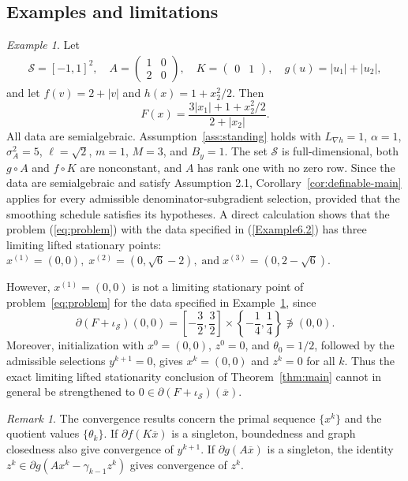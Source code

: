 \documentclass[9pt]{article}
\numberwithin{equation}{section}
\theoremstyle{definition}
\theoremstyle{remark}
\newtheorem{remark}[theorem]{Remark}
\newtheorem{example}[theorem]{Example}
\newcommand{\Sset}{\mathcal S}
\newcommand{\abs}[1]{\left\lvert #1\right\rvert}
\begin{document}
\subsection{Examples and limitations}
\label{subsec:examples-limitations}
\begin{example}
\label{ex:active}
Let
\begin{eqnarray}\label{Example6.2}
 \Sset=[-1,1]^2,\quad
 A=\begin{pmatrix}1&0\\2&0\end{pmatrix},\quad
 K=\begin{pmatrix}0&1\end{pmatrix},\quad
 g(u)=\abs{u_1}+\abs{u_2},
\end{eqnarray}
and let $f(v)=2+\abs v$ and $h(x)=1+x_2^2/2$. Then
\[
 F(x)=\frac{3\abs{x_1}+1+x_2^2/2}{2+\abs{x_2}}.
\]
All data are semialgebraic. Assumption~\ref{ass:standing} holds with
$L_{\nabla h}=1$, $\alpha=1$, $\sigma_A^2=5$, $\ell=\sqrt2$,
$m=1$, $M=3$, and $B_y=1$. The set $\Sset$ is full-dimensional,
both $g\circ A$ and $f\circ K$ are nonconstant, and $A$ has rank one
with no zero row.
Since the data are semialgebraic and satisfy Assumption 2.1, Corollary~\ref{cor:definable-main} applies for every admissible denominator-subgradient selection, provided that the smoothing schedule satisfies its hypotheses. A direct calculation shows that the
problem (\ref{eq:problem}) with the data specified in
(\ref{Example6.2}) has three limiting lifted stationary points:
$
x^{(1)}=(0,0),\; x^{(2)}=(0,\sqrt{6}-2),\;\mbox{and}\; x^{(3)}=(0,2-\sqrt{6}).
$

However, \(x^{(1)}=(0,0)\) is not a limiting stationary point of
problem~\eqref{eq:problem} for the data specified in
Example~\ref{ex:active}, since
\[
 \partial(F+\iota_{\Sset})(0,0)
 =\left[-\frac32,\frac32\right]
       \times\left\{-\frac14,\frac14\right\}
 \not\ni(0,0).
\]
Moreover, initialization with $x^0=(0,0)$, $z^0=0$, and
$\theta_0=1/2$, followed by the admissible selections
$y^{k+1}=0$, gives $x^k=(0,0)$ and $z^k=0$ for all $k$.
Thus the exact limiting lifted stationarity conclusion of
Theorem~\ref{thm:main} cannot in general be strengthened to
$0\in\partial(F+\iota_{\Sset})(\overline x)$.

\end{example}

\begin{remark}\label{rem:whole-sequence}
The convergence results concern the primal sequence $\{x^k\}$
and the quotient values $\{\theta_k\}$. If
$\partial f(K\overline x)$ is a singleton, boundedness and graph
closedness also give convergence of $y^{k+1}$. If
$\partial g(A\overline x)$ is a singleton, the identity
$z^k\in\partial g(Ax^k-\gamma_{k-1}z^k)$ gives convergence of $z^k$.
\end{remark}
\end{document}

